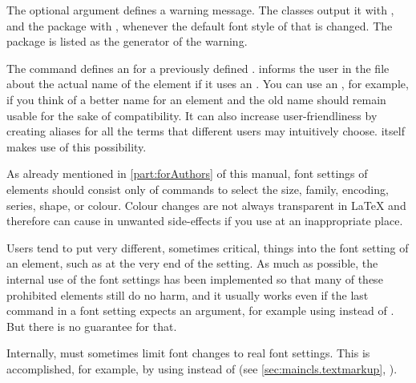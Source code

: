 The optional  argument defines a warning message. The
\KOMAScript{} classes output it with , and the
 package with , whenever the default
font style of that  is changed. The package 
is listed as the generator of the warning.

The  command defines an  for a previously
defined . \KOMAScript{} informs the user in the  file
about the actual name of the element if it uses an .
You can use an , for example, if you think of a
better name for an element and the old name should remain usable for the sake
of compatibility. It can also increase user-friendliness by creating aliases
for all the terms that different users may intuitively choose. \KOMAScript{}
itself makes use of this possibility.%
\EndIndexGroup


\begin{Declaration}
\end{Declaration}
As already mentioned in \autoref{part:forAuthors} of this manual, font
settings of elements should consist only of commands to select the size,
family, encoding, series, shape, or colour. Colour changes are not
always transparent in \LaTeX{} and therefore can cause in unwanted side-effects
if you use  at an inappropriate place.

Users tend to put very different, sometimes critical, things into the font
setting of an element, such as  at the very end of the
setting. As much as possible, the internal use of the font settings has been
implemented so that many of these prohibited elements still do no harm, and it
usually works even if the last command in a font setting expects an argument,
for example using  instead of . But there is no
guarantee for that.

Internally, \KOMAScript{} must sometimes limit font changes to real font
settings. This is accomplished, for example, by using
%
%
%
%
 instead of 
(see \autoref{sec:maincls.textmarkup},
).

